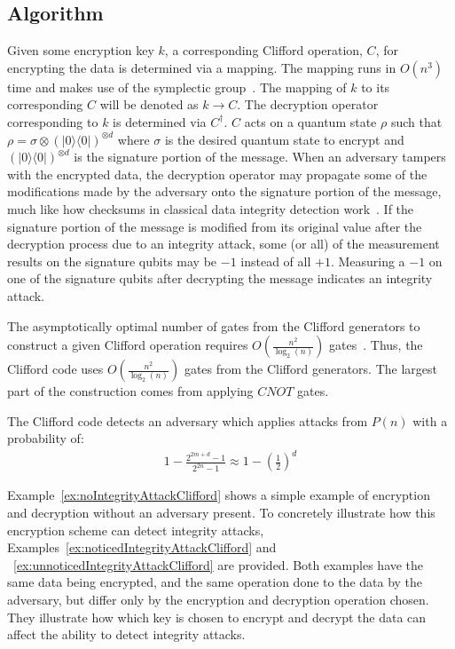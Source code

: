 \subsection{Algorithm}
Given some encryption key $k$, a corresponding Clifford operation, $C$, for encrypting the data is determined via a mapping. The mapping runs in $O \left(n^3 \right)$ time and makes use of the symplectic group~\cite{Koenig2014}. The mapping of $k$ to its corresponding $C$ will be denoted as $k \rightarrow C$. The decryption operator corresponding to $k$ is determined via $C^{\dagger}$. $C$ acts on a quantum state $\rho$ such that $\rho = \sigma \otimes (|0\rangle \langle0|)^{\otimes d}$ where $\sigma$ is the desired quantum state to encrypt and $(|0\rangle \langle0|)^{\otimes d}$ is the signature portion of the message. When an adversary tampers with the encrypted data, the decryption operator may propagate some of the modifications made by the adversary onto the signature portion of the message, much like how checksums in classical data integrity detection work~\cite{checksumWikipedia}. If the signature portion of the message is modified from its original value after the decryption process due to an integrity attack, some (or all) of the measurement results on the signature qubits may be $-1$ instead of all $+1$. Measuring a $-1$ on one of the signature qubits after decrypting the message indicates an integrity attack.

The asymptotically optimal number of gates from the Clifford generators to construct a given Clifford operation requires $O\left(\frac{n^2}{\log_2(n)} \right)$ gates~\cite{bravyi2021hadamard,patel2008optimal}. Thus, the Clifford code uses $O \left(\frac{n^2}{\log_2(n)} \right)$ gates from the Clifford generators. The largest part of the construction comes from applying $\mathit{CNOT}$ gates.

The Clifford code detects an adversary which applies attacks from $P(n)$ with a probability of:
\begin{align}
1-\frac{2^{2 m+d}-1}{2^{2 n}-1} \approx 1-\left(\frac{1}{2}\right)^{d} \label{eq:CliffordCodeProbabilityOfDetection}
\end{align}

Example~\ref{ex:noIntegrityAttackClifford} shows a simple example of encryption and decryption without an adversary present. To concretely illustrate how this encryption scheme can detect integrity attacks, Examples~\ref{ex:noticedIntegrityAttackClifford} and ~\ref{ex:unnoticedIntegrityAttackClifford} are provided. Both examples have the same data being encrypted, and the same operation done to the data by the adversary, but differ only by the encryption and decryption operation chosen. They illustrate how which key is chosen to encrypt and decrypt the data can affect the ability to detect integrity attacks.

